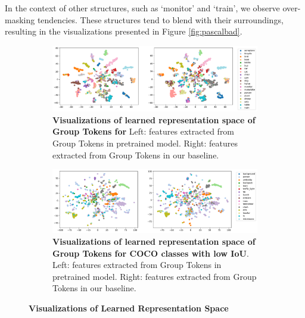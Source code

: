 In the context of other structures, such as `monitor' and `train', we observe over-masking tendencies. These structures tend to blend with their surroundings, resulting in the visualizations presented in Figure \ref{fig:pascalbad}.
\begin{figure}[t]
\centering

\begin{subfigure}{\linewidth}
    \includegraphics[width=\linewidth]{figures/fig_plots/tsne.pdf}
    \caption[\textbf{Visualizations of learned representation space of Group Tokens for \pvoc}]{\textbf{Visualizations of learned representation space of Group Tokens for \pvoc} Left: features extracted from Group Tokens in pretrained model. Right: features extracted from Group Tokens in our baseline.}
    \label{fig:voctsne}
\end{subfigure}

\begin{subfigure}{\linewidth}
    \includegraphics[width=\linewidth]{figures/fig_plots/allfeat_tsne_plot_org_baseline_coco_lowmIoU.pdf}
    \caption[\textbf{Visualizations of learned representation space of Group Tokens on COCO classes with low IoU}]{ \textbf{Visualizations of learned representation space of Group Tokens for COCO classes with low IoU}. Left: features extracted from Group Tokens in pretrained model. Right: features extracted from Group Tokens in our baseline.}
    \label{fig:cocotsne}
\end{subfigure}

\caption{\textbf{Visualizations of Learned Representation Space }}
\label{fig:feature_comparison}
\end{figure}


